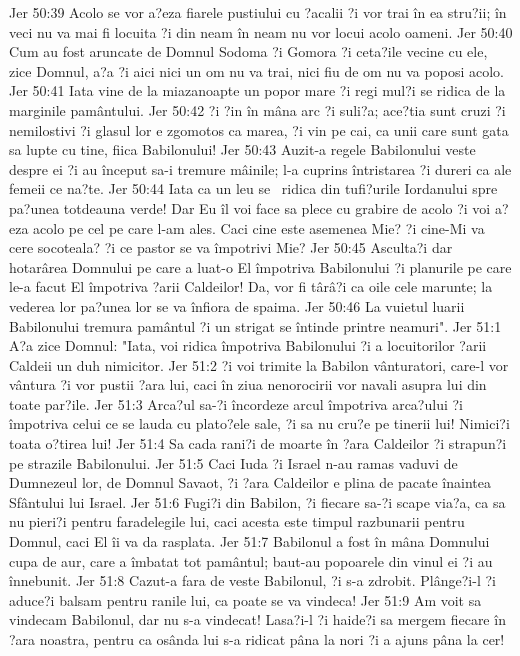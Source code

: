 Jer 50:39  Acolo se vor a?eza fiarele pustiului cu ?acalii ?i vor trai în ea stru?ii; în veci nu va mai fi locuita ?i din neam în neam nu vor locui acolo oameni.
Jer 50:40  Cum au fost aruncate de Domnul Sodoma ?i Gomora ?i ceta?ile vecine cu ele, zice Domnul, a?a ?i aici nici un om nu va trai, nici fiu de om nu va poposi acolo.
Jer 50:41  Iata vine de la miazanoapte un popor mare ?i regi mul?i se ridica de la marginile pamântului.
Jer 50:42  ?i ?in în mâna arc ?i suli?a; ace?tia sunt cruzi ?i nemilostivi ?i glasul lor e zgomotos ca marea, ?i vin pe cai, ca unii care sunt gata sa lupte cu tine, fiica Babilonului!
Jer 50:43  Auzit-a regele Babilonului veste despre ei ?i au început sa-i tremure mâinile; l-a cuprins întristarea ?i dureri ca ale femeii ce na?te.
Jer 50:44  Iata ca un leu se  ridica din tufi?urile Iordanului spre pa?unea totdeauna verde! Dar Eu îl voi face sa plece cu grabire de acolo ?i voi a?eza acolo pe cel pe care l-am ales. Caci cine este asemenea Mie? ?i cine-Mi va cere socoteala? ?i ce pastor se va împotrivi Mie?
Jer 50:45  Asculta?i dar hotarârea Domnului pe care a luat-o El împotriva Babilonului ?i planurile pe care le-a facut El împotriva ?arii Caldeilor! Da, vor fi târâ?i ca oile cele marunte; la vederea lor pa?unea lor se va înfiora de spaima.
Jer 50:46  La vuietul luarii Babilonului tremura pamântul ?i un strigat se întinde printre neamuri".
Jer 51:1  A?a zice Domnul: "Iata, voi ridica împotriva Babilonului ?i a locuitorilor ?arii Caldeii un duh nimicitor.
Jer 51:2  ?i voi trimite la Babilon vânturatori, care-l vor vântura ?i vor pustii ?ara lui, caci în ziua nenorocirii vor navali asupra lui din toate par?ile.
Jer 51:3  Arca?ul sa-?i încordeze arcul împotriva arca?ului ?i împotriva celui ce se lauda cu plato?ele sale, ?i sa nu cru?e pe tinerii lui! Nimici?i toata o?tirea lui!
Jer 51:4  Sa cada rani?i de moarte în ?ara Caldeilor ?i strapun?i pe strazile Babilonului.
Jer 51:5  Caci Iuda ?i Israel n-au ramas vaduvi de Dumnezeul lor, de Domnul Savaot, ?i ?ara Caldeilor e plina de pacate înaintea Sfântului lui Israel.
Jer 51:6  Fugi?i din Babilon, ?i fiecare sa-?i scape via?a, ca sa nu pieri?i pentru faradelegile lui, caci acesta este timpul razbunarii pentru Domnul, caci El îi va da rasplata.
Jer 51:7  Babilonul a fost în mâna Domnului cupa de aur, care a îmbatat tot pamântul; baut-au popoarele din vinul ei ?i au înnebunit.
Jer 51:8  Cazut-a fara de veste Babilonul, ?i s-a zdrobit. Plânge?i-l ?i aduce?i balsam pentru ranile lui, ca poate se va vindeca!
Jer 51:9  Am voit sa vindecam Babilonul, dar nu s-a vindecat! Lasa?i-l ?i haide?i sa mergem fiecare în ?ara noastra, pentru ca osânda lui s-a ridicat pâna la nori ?i a ajuns pâna la cer!
